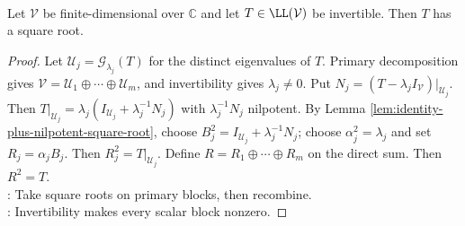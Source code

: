 \begin{theorem} \label{thm:complex-invertible-operator-has-square-root} \\
Let $\mathcal{V}$ be finite-dimensional over $\mathbb{C}$ and let $T\in\LL(\mathcal{V})$ be invertible. Then $T$ has a square root.
\begin{proof}
Let $\mathcal{U}_j=\mathcal{G}_{\lambda_j}(T)$ for the distinct eigenvalues of $T$. Primary decomposition gives $\mathcal{V}=\mathcal{U}_1\oplus\cdots\oplus\mathcal{U}_m$, and invertibility gives $\lambda_j\neq0$. Put $N_j=(T-\lambda_jI_{\mathcal{V}})|_{\mathcal{U}_j}$.\\
Then $T|_{\mathcal{U}_j} =\lambda_j\left(I_{\mathcal{U}_j}+\lambda_j^{-1}N_j\right)$ with $\lambda_j^{-1}N_j$ nilpotent. By Lemma \ref{lem:identity-plus-nilpotent-square-root}, choose $B_j^2=I_{\mathcal{U}_j}+\lambda_j^{-1}N_j$; choose $\alpha_j^2=\lambda_j$ and set $R_j=\alpha_jB_j$. Then $R_j^2=T|_{\mathcal{U}_j}$. Define $R=R_1\oplus\cdots\oplus R_m$ on the direct sum. Then $R^2=T$.\\
: Take square roots on primary blocks, then recombine.\\
: Invertibility makes every scalar block nonzero.
\end{proof}
\end{theorem}
